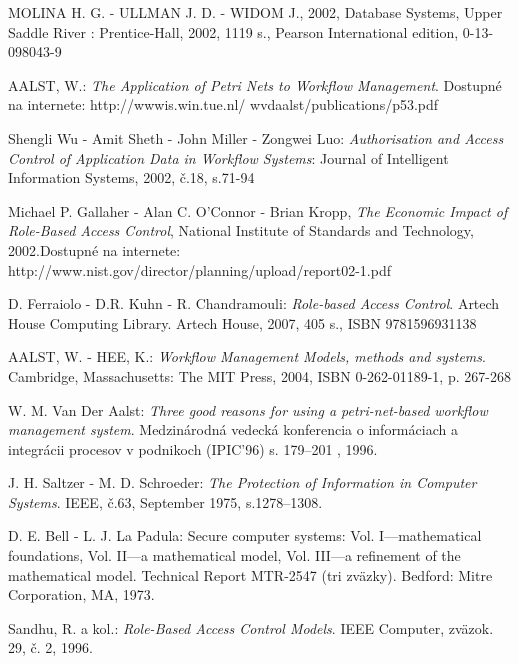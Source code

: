 \documentclass[12pt, oneside]{book}
\begin{document}
%

% 

\begin{thebibliography}{5}
 
 MOLINA H. G. - ULLMAN J. D. - WIDOM J., 2002, Database Systems, Upper Saddle River : Prentice-Hall, 2002, 1119 s., Pearson International edition, 0-13-098043-9

AALST, W.: \textit{The Application of Petri Nets to Workflow Management}. Dostupné
na internete: http://wwwis.win.tue.nl/ wvdaalst/publications/p53.pdf

Shengli Wu - Amit Sheth - John Miller - Zongwei Luo:\textit{ Authorisation and Access Control of Application Data
	in Workflow Systems}: Journal of Intelligent Information Systems, 2002, č.18, s.71-94

Michael P. Gallaher - Alan C. O'Connor - Brian Kropp, \textit{ The Economic Impact
of Role-Based Access Control}, National Institute of Standards and Technology,
2002.Dostupné na internete: http://www.nist.gov/director/planning/upload/report02-1.pdf

D. Ferraiolo - D.R. Kuhn - R. Chandramouli: \textit{Role-based Access Control}. Artech
House Computing Library. Artech House, 2007, 405 s., ISBN 9781596931138


AALST, W. - HEE, K.: \textit{Workflow Management Models, methods and systems}. Cambridge,
Massachusetts: The MIT Press, 2004, ISBN 0-262-01189-1, p.
267-268

W. M. Van Der Aalst: \textit{Three good reasons for using a petri-net-based workflow
management system}. Medzinárodná vedecká konferencia o informáciach a integrácii procesov v podnikoch (IPIC’96)
s. 179–201 , 1996.

J. H. Saltzer - M. D. Schroeder: \textit{The Protection of Information in Computer
Systems}.  IEEE, č.63, September 1975, s.1278–1308.

D. E. Bell - L. J. La Padula: Secure computer systems: Vol. I—mathematical
foundations,  Vol. II—a mathematical model,  Vol. III—a refinement of the mathematical
model. Technical Report MTR-2547 (tri zväzky). Bedford: Mitre Corporation, MA, 1973.

Sandhu, R. a kol.: \textit{Role-Based Access Control Models}. IEEE Computer, zväzok.
29, č. 2, 1996.


\end{thebibliography}
\end{document}
